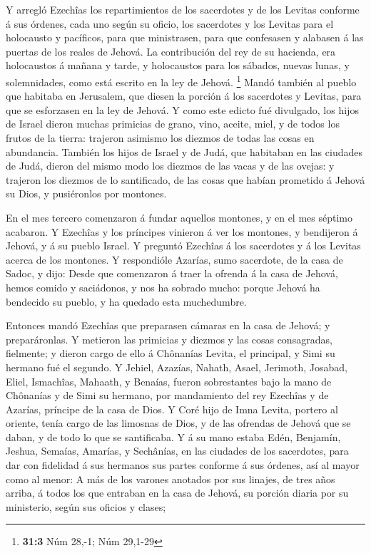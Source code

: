  Y arregló Ezechîas los repartimientos de los sacerdotes y
de los Levitas conforme á sus órdenes, cada uno según su oficio, los
sacerdotes y los Levitas para el holocausto y pacíficos, para que
ministrasen, para que confesasen y alabasen á las puertas de los reales
de Jehová.  La contribución del rey de su hacienda, era
holocaustos á mañana y tarde, y holocaustos para los sábados, nuevas
lunas, y solemnidades, como está escrito en la ley de Jehová.
\footnote{\textbf{31:3} Núm 28,-1; Núm 29,1-29}  Mandó
también al pueblo que habitaba en Jerusalem, que diesen la porción á los
sacerdotes y Levitas, para que se esforzasen en la ley de Jehová.
 Y como este edicto fué divulgado, los hijos de Israel
dieron muchas primicias de grano, vino, aceite, miel, y de todos los
frutos de la tierra: trajeron asimismo los diezmos de todas las cosas en
abundancia.  También los hijos de Israel y de Judá, que
habitaban en las ciudades de Judá, dieron del mismo modo los diezmos de
las vacas y de las ovejas: y trajeron los diezmos de lo santificado, de
las cosas que habían prometido á Jehová su Dios, y pusiéronlos por
montones.

 En el mes tercero comenzaron á fundar aquellos montones,
y en el mes séptimo acabaron.  Y Ezechîas y los príncipes
vinieron á ver los montones, y bendijeron á Jehová, y á su pueblo
Israel.  Y preguntó Ezechîas á los sacerdotes y á los
Levitas acerca de los montones.  Y respondióle Azarías,
sumo sacerdote, de la casa de Sadoc, y dijo: Desde que comenzaron á
traer la ofrenda á la casa de Jehová, hemos comido y saciádonos, y nos
ha sobrado mucho: porque Jehová ha bendecido su pueblo, y ha quedado
esta muchedumbre.

 Entonces mandó Ezechîas que preparasen cámaras en la
casa de Jehová; y preparáronlas.  Y metieron las
primicias y diezmos y las cosas consagradas, fielmente; y dieron cargo
de ello á Chônanías Levita, el principal, y Simi su hermano fué el
segundo.  Y Jehiel, Azazías, Nahath, Asael, Jerimoth,
Josabad, Eliel, Ismachîas, Mahaath, y Benaías, fueron sobrestantes bajo
la mano de Chônanías y de Simi su hermano, por mandamiento del rey
Ezechîas y de Azarías, príncipe de la casa de Dios.  Y
Coré hijo de Imna Levita, portero al oriente, tenía cargo de las
limosnas de Dios, y de las ofrendas de Jehová que se daban, y de todo lo
que se santificaba.  Y á su mano estaba Edén, Benjamín,
Jeshua, Semaías, Amarías, y Sechânías, en las ciudades de los
sacerdotes, para dar con fidelidad á sus hermanos sus partes conforme á
sus órdenes, así al mayor como al menor:  A más de los
varones anotados por sus linajes, de tres años arriba, á todos los que
entraban en la casa de Jehová, su porción diaria por su ministerio,
según sus oficios y clases;

